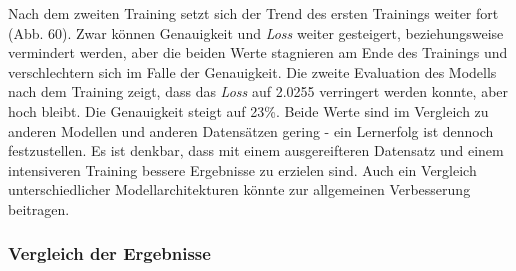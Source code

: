 \documentclass[a4paper,12pt,ngerman]{article}
\begin{document}
Nach dem zweiten Training setzt sich der Trend des ersten Trainings weiter fort (Abb. 60). Zwar können Genauigkeit und \textit{Loss} weiter gesteigert, beziehungsweise vermindert werden, aber die beiden Werte stagnieren am Ende des Trainings und verschlechtern sich im Falle der Genauigkeit. Die zweite Evaluation des Modells nach dem Training zeigt, dass das \textit{Loss} auf 2.0255 verringert werden konnte, aber hoch bleibt. Die Genauigkeit steigt auf 23\%. Beide Werte sind im Vergleich zu anderen Modellen und anderen Datensätzen gering - ein Lernerfolg ist dennoch festzustellen. Es ist denkbar, dass mit einem ausgereifteren Datensatz und einem intensiveren Training bessere Ergebnisse zu erzielen sind. Auch ein Vergleich unterschiedlicher Modellarchitekturen könnte zur allgemeinen Verbesserung beitragen. \\

\subsubsection{Vergleich der Ergebnisse}
\end{document}
